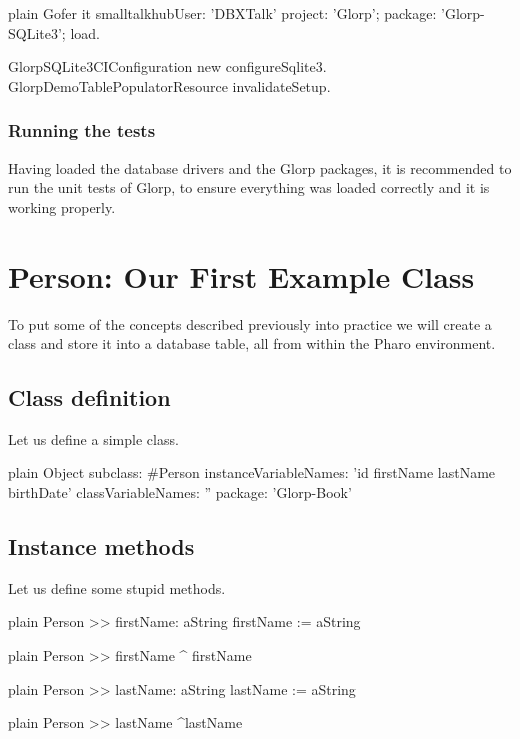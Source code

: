 \documentclass[10pt,twoside,english]{_support/latex/sbabook/sbabook}
\begin{document}
\begin{displaycode}{plain}
Gofer it 
	smalltalkhubUser: 'DBXTalk' project: 'Glorp';
	package: 'Glorp-SQLite3';
	load.
		
	GlorpSQLite3CIConfiguration new configureSqlite3.
	GlorpDemoTablePopulatorResource invalidateSetup.
\end{displaycode}
\subsection{Running the tests}
Having loaded the database drivers and the Glorp packages, it is recommended to
run the unit tests of Glorp, to ensure everything was loaded correctly and it
is working properly.
\chapter{Person: Our First Example Class}
To put some of the concepts described previously into practice we will create
a  class and store it into a  database table,
all from within the Pharo environment.
\section{Class definition}
Let us define a simple class.

\begin{displaycode}{plain}
Object subclass: #Person
	instanceVariableNames: 'id firstName lastName birthDate'
	classVariableNames: ''
	package: 'Glorp-Book'
\end{displaycode}
\section{Instance methods}
Let us define some stupid methods. 

\begin{displaycode}{plain}
Person >> firstName: aString
	firstName := aString
\end{displaycode}

\begin{displaycode}{plain}
Person >> firstName
	^ firstName
\end{displaycode}

\begin{displaycode}{plain}
Person >> lastName: aString
	lastName := aString
\end{displaycode}

\begin{displaycode}{plain}
Person >> lastName
	^lastName
\end{displaycode}
\end{document}
